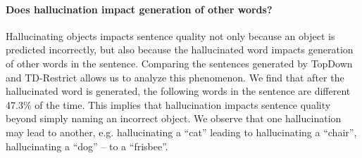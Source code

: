 \begin{table}[t]
\centering
\small
{}
\caption{\small Pearson correlation coefficients between individual/combined metrics and human scores. See Section~\ref{sec:metrics_analysis}.}
\label{tab:correlation_human}
\end{table}

\paragraph{Does hallucination impact generation of other words?} 
%
Hallucinating objects impacts sentence quality not only because an object is predicted incorrectly, but also because the hallucinated word impacts generation of other words in the sentence. Comparing the sentences generated by TopDown and TD-Restrict allows us to analyze this phenomenon. We find that after the hallucinated word is generated, the following words in the sentence are different 47.3\% of the time. This implies that hallucination impacts sentence quality beyond simply naming an incorrect object.
%
We observe that one hallucination may lead to another, e.g. hallucinating a ``cat'' leading to hallucinating a ``chair'', hallucinating a ``dog'' -- to a ``frisbee''.

%

